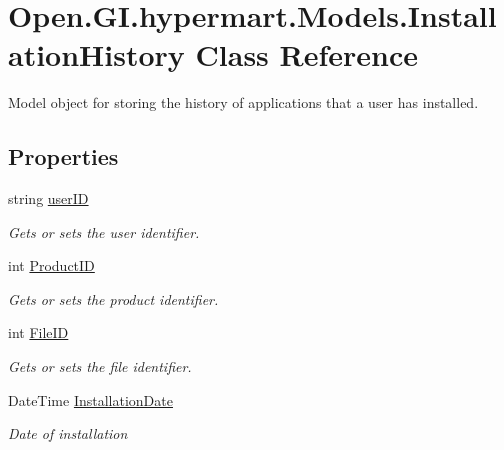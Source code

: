 \hypertarget{class_open_1_1_g_i_1_1hypermart_1_1_models_1_1_installation_history}{}\section{Open.\+G\+I.\+hypermart.\+Models.\+Installation\+History Class Reference}
\label{class_open_1_1_g_i_1_1hypermart_1_1_models_1_1_installation_history}


Model object for storing the history of applications that a user has installed.  


\subsection*{Properties}
\begin{DoxyCompactItemize}
\item 
string \hyperlink{class_open_1_1_g_i_1_1hypermart_1_1_models_1_1_installation_history_acfc4d740fbdade68a23eb93a577c9539}{user\+ID}
\begin{DoxyCompactList}\small\item\em Gets or sets the user identifier. \end{DoxyCompactList}\item 
int \hyperlink{class_open_1_1_g_i_1_1hypermart_1_1_models_1_1_installation_history_a42a9e298540659d4ef03d7bf2440fdae}{Product\+ID}
\begin{DoxyCompactList}\small\item\em Gets or sets the product identifier. \end{DoxyCompactList}\item 
int \hyperlink{class_open_1_1_g_i_1_1hypermart_1_1_models_1_1_installation_history_ab0b9384f5250f31dc6120af767bfd6ff}{File\+ID}
\begin{DoxyCompactList}\small\item\em Gets or sets the file identifier. \end{DoxyCompactList}\item 
Date\+Time \hyperlink{class_open_1_1_g_i_1_1hypermart_1_1_models_1_1_installation_history_a6a5b73639b8fabacda9d9661de4ad89c}{Installation\+Date}
\begin{DoxyCompactList}\small\item\em Date of installation \end{DoxyCompactList}\end{DoxyCompactItemize}



